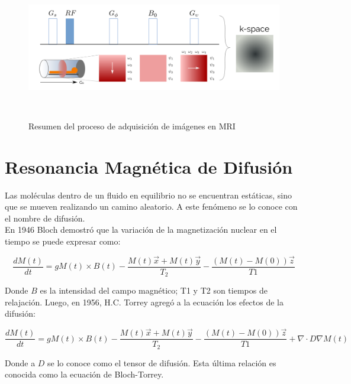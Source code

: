\begin{figure}[h!]
                                                                                                                        
\begin{minipage}[b]{\textwidth}
    \includegraphics[width=\textwidth]{img/kspace.png}
    \caption{Resumen del proceso de adquisici\'on de im\'agenes en MRI}
    \label{fig:kspace}
\end{minipage} ~

\end{figure}  



\section{Resonancia Magn\'etica de Difusi\'on}

Las mol\'eculas dentro de un fluido en equilibrio no se encuentran est\'aticas,
sino que se mueven realizando un camino aleatorio. A este fen\'omeno se lo 
conoce con el nombre de difusi\'on.  \\

En 1946 Bloch \cite{Bloch1946} demostr\'o que la variaci\'on de la magnetizaci\'on
nuclear en el tiempo se puede expresar como:

$$ \frac{dM(t)}{dt} = g M(t) \times B(t) 
                      - \frac{M(t) \vec{x} + M(t)\vec{y}}{T_2}
                      - \frac{(M(t)-M(0))\vec{z}}{T1} $$

Donde $B$ es la intensidad del campo magn\'etico; T1 y T2 son tiempos de
relajaci\'on. Luego, en 1956, H.C. Torrey \cite{Torrey1956} agreg\'o a la
ecuaci\'on      los efectos de la difusi\'on:

$$ \frac{dM(t)}{dt} = g M(t) \times B(t) 
                      - \frac{M(t) \vec{x} + M(t)\vec{y}}{T_2}
                      - \frac{(M(t)-M(0))\vec{z}}{T1} 
                      + \nabla \cdot D \nabla M(t) $$

Donde a $D$ se lo conoce como el tensor de difusi\'on. Esta \'ultima relaci\'on
es conocida como la ecuaci\'on de Bloch-Torrey.\\

